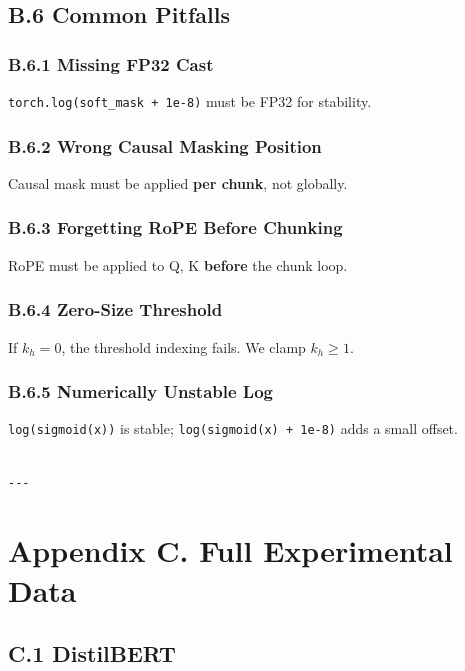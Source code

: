 \subsection{B.6 Common Pitfalls}

\subsubsection{B.6.1 Missing FP32 Cast}

\texttt{torch.log(soft\_mask + 1e-8)} must be FP32 for stability.

\subsubsection{B.6.2 Wrong Causal Masking Position}

Causal mask must be applied \textbf{per chunk}, not globally.

\subsubsection{B.6.3 Forgetting RoPE Before Chunking}

RoPE must be applied to Q, K \textbf{before} the chunk loop.

\subsubsection{B.6.4 Zero-Size Threshold}

If $k_h = 0$, the threshold indexing fails. We clamp $k_h \ge 1$.

\subsubsection{B.6.5 Numerically Unstable Log}

\texttt{log(sigmoid(x))} is stable; \texttt{log(sigmoid(x) + 1e-8)} adds a small offset.
\begin{lstlisting}

---
\end{lstlisting}


\section{Appendix C. Full Experimental Data}

\subsection{C.1 DistilBERT}

